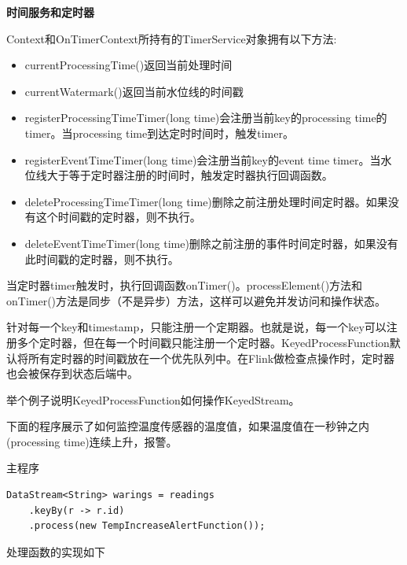 \documentclass[cn,11pt,chinese]{elegantbook}
\begin{document}
\textbf{时间服务和定时器}

Context和OnTimerContext所持有的TimerService对象拥有以下方法:

\begin{itemize}
    \item currentProcessingTime()返回当前处理时间
    \item currentWatermark()返回当前水位线的时间戳
    \item registerProcessingTimeTimer(long time)会注册当前key的processing time的timer。当processing time到达定时时间时，触发timer。
    \item registerEventTimeTimer(long time)会注册当前key的event time timer。当水位线大于等于定时器注册的时间时，触发定时器执行回调函数。
    \item deleteProcessingTimeTimer(long time)删除之前注册处理时间定时器。如果没有这个时间戳的定时器，则不执行。
    \item deleteEventTimeTimer(long time)删除之前注册的事件时间定时器，如果没有此时间戳的定时器，则不执行。
\end{itemize}

当定时器timer触发时，执行回调函数onTimer()。processElement()方法和onTimer()方法是同步（不是异步）方法，这样可以避免并发访问和操作状态。

针对每一个key和timestamp，只能注册一个定期器。也就是说，每一个key可以注册多个定时器，但在每一个时间戳只能注册一个定时器。KeyedProcessFunction默认将所有定时器的时间戳放在一个优先队列中。在Flink做检查点操作时，定时器也会被保存到状态后端中。

举个例子说明KeyedProcessFunction如何操作KeyedStream。

下面的程序展示了如何监控温度传感器的温度值，如果温度值在一秒钟之内(processing time)连续上升，报警。

主程序

\begin{verbatim}
DataStream<String> warings = readings
    .keyBy(r -> r.id)
    .process(new TempIncreaseAlertFunction());
\end{verbatim}

处理函数的实现如下
\end{document}
